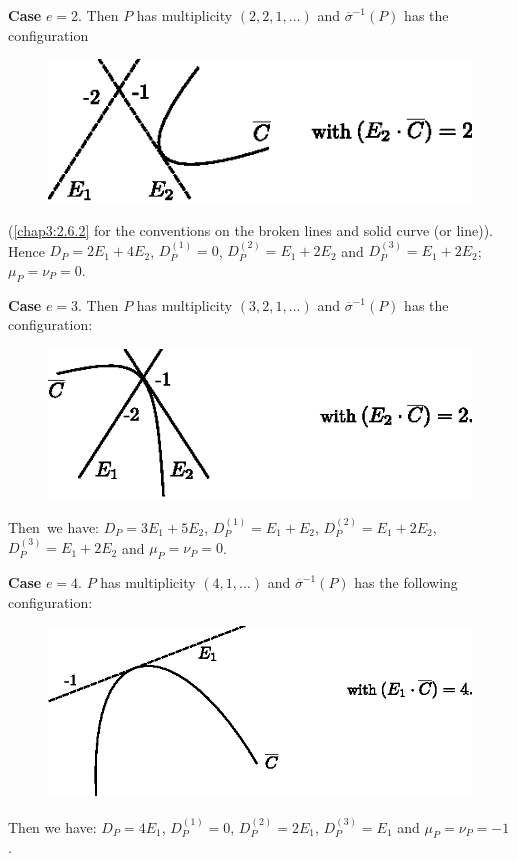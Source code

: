 \medskip
\noindent
{\bf Case} $e=2$. Then $P$ has multiplicity $(2,2,1,\ldots)$ and
$\overline{\sigma}^{-1}(P)$ has the configuration
\begin{figure}[H]
\centering
\includegraphics{figures/miyansi_fig30.eps}
\end{figure}
\noindent
(\cf \ref{chap3:2.6.2} for the conventions on the broken lines and solid
curve (or line)). Hence $D_{P}=2E_{1}+4E_{2}$, $D^{(1)}_{P}=0$,
$D^{(2)}_{P}=E_{1}+2E_{2}$ and $D^{(3)}_{P}=E_{1}+2E_{2}$;
$\mu_{P}=\nu_{P}=0$.

\medskip
\noindent
{\bf Case} $e=3$. Then $P$ has multiplicity $(3,2,1,\ldots)$ and
$\overline{\sigma}^{-1}(P)$ has the configuration:
\begin{figure}[H]
\centering
\includegraphics{figures/miyansi_fig31.eps}
\end{figure}
Then\pageoriginale\ we have: $D_{P}=3E_{1}+5E_{2}$,
$D^{(1)}_{P}=E_{1}+E_{2}$, $D^{(2)}_{P}=E_{1}+2E_{2}$,
$D^{(3)}_{P}=E_{1}+2E_{2}$ and $\mu_{P}=\nu_{P}=0$.

\medskip
\noindent
{\bf Case} $e=4$. $P$ has multiplicity $(4,1,\ldots)$ and
$\overline{\sigma}^{-1}(P)$ has the following configuration:
\begin{figure}[H]
\centering
\includegraphics{figures/miyansi_fig32-1.eps}
\end{figure}
Then we have: $D_{P}=4E_{1}$, $D^{(1)}_{P}=0$, $D^{(2)}_{P}=2E_{1}$,
$D^{(3)}_{P}=E_{1}$ and $\mu_{P}=\nu_{P}=-1$.

